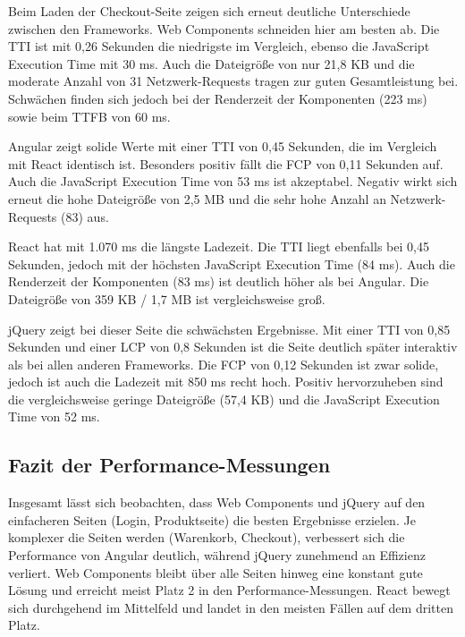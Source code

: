 \documentclass[oneside]{ausarbeitung}
\begin{document}
Beim Laden der Checkout-Seite zeigen sich erneut deutliche Unterschiede zwischen den Frameworks. Web Components schneiden hier am besten ab. Die TTI ist mit 0,26 Sekunden die niedrigste im Vergleich, ebenso die JavaScript Execution Time mit 30 ms. Auch die Dateigröße von nur 21,8 KB und die moderate Anzahl von 31 Netzwerk-Requests tragen zur guten Gesamtleistung bei. Schwächen finden sich jedoch bei der Renderzeit der Komponenten (223 ms) sowie beim TTFB von 60 ms.

Angular zeigt solide Werte mit einer TTI von 0,45 Sekunden, die im Vergleich mit React identisch ist. Besonders positiv fällt die FCP von 0,11 Sekunden auf. Auch die JavaScript Execution Time von 53 ms ist akzeptabel. Negativ wirkt sich erneut die hohe Dateigröße von 2,5 MB und die sehr hohe Anzahl an Netzwerk-Requests (83) aus.

React hat mit 1.070 ms die längste Ladezeit. Die TTI liegt ebenfalls bei 0,45 Sekunden, jedoch mit der höchsten JavaScript Execution Time (84 ms). Auch die Renderzeit der Komponenten (83 ms) ist deutlich höher als bei Angular. Die Dateigröße von 359 KB / 1,7 MB ist vergleichsweise groß.

jQuery zeigt bei dieser Seite die schwächsten Ergebnisse. Mit einer TTI von 0,85 Sekunden und einer LCP von 0,8 Sekunden ist die Seite deutlich später interaktiv als bei allen anderen Frameworks. Die FCP von 0,12 Sekunden ist zwar solide, jedoch ist auch die Ladezeit mit 850 ms recht hoch. Positiv hervorzuheben sind die vergleichsweise geringe Dateigröße (57,4 KB) und die JavaScript Execution Time von 52 ms.

\subsection{Fazit der Performance-Messungen}

Insgesamt lässt sich beobachten, dass Web Components und jQuery auf den einfacheren Seiten (Login, Produktseite) die besten Ergebnisse erzielen. Je komplexer die Seiten werden (Warenkorb, Checkout), verbessert sich die Performance von Angular deutlich, während jQuery zunehmend an Effizienz verliert. Web Components bleibt über alle Seiten hinweg eine konstant gute Lösung und erreicht meist Platz 2 in den Performance-Messungen. React bewegt sich durchgehend im Mittelfeld und landet in den meisten Fällen auf dem dritten Platz.
\end{document}
